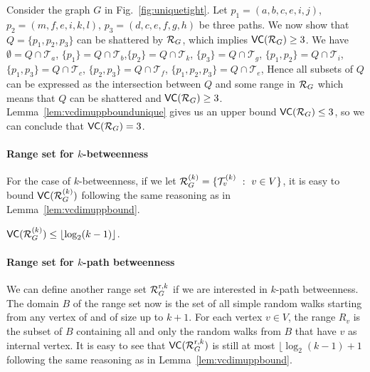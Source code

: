 \begin{IEEEproof}
  Consider the graph $G$ in Fig.~\ref{fig:uniquetight}.
  Let $p_1=(a,b,c,e,i,j)$, $p_2=(m,f,e,i,k,l)$, $p_3=(d,c,e,f,g,h)$ be three
  paths. We now show that $Q=\{p_1,p_2,p_3\}$ can be shattered by $\mathcal{R}_G$, which
  implies $\mathsf{VC}(\mathcal{R}_G)\ge 3$. We have $\emptyset=Q\cap\mathcal{T}_a$,
  $\{p_1\}=Q\cap\mathcal{T}_b$,$\{p_2\}=Q\cap\mathcal{T}_k$,
  $\{p_3\}=Q\cap\mathcal{T}_g$, $\{p_1,p_2\}=Q\cap\mathcal{T}_i$,
  $\{p_1,p_3\}=Q\cap\mathcal{T}_c$, $\{p_2,p_3\}=Q\cap\mathcal{T}_f$,
  $\{p_1,p_2,p_3\}=Q\cap\mathcal{T}_e$,  
  Hence all subsets of $Q$ can be expressed as the intersection between $Q$ and
  some range in $\mathcal{R}_G$ which means that $Q$ can be shattered and
  $\mathsf{VC}(\mathcal{R}_G)\ge 3$. Lemma~\ref{lem:vcdimuppboundunique} gives us an upper
  bound $\mathsf{VC}(\mathcal{R}_G)\le3$, so we can conclude that $\mathsf{VC}(\mathcal{R}_G)=3$.
\end{IEEEproof}

\paragraph{Range set for $k$-betweenness} For the case of $k$-betweenness, if we let
$\mathcal{R}_G^{(k)}=\{\mathcal{T}_v^{(k)}~:~ v\in V\}$, it is easy to bound
$\mathsf{VC}(\mathcal{R}_G^{(k)})$ following the same reasoning as in
Lemma~\ref{lem:vcdimuppbound}.
\begin{lemma}\label{lem:vcdimuppboundk}
$\mathsf{VC}(\mathcal{R}_G^{(k)})\le\lfloor\log_2(k-1)\rfloor$.
\end{lemma}

\paragraph{Range set for $k$-path betweenness}
We can define another range set $\mathcal{R}_G^{\mathrm{r},k}$ if we are interested
in $k$-path betweenness.  The domain $B$ of the range set now is the set of all
simple random walks starting from any vertex of and of size up to $k+1$. For
each vertex $v\in V$, the range $R_v$ is the subset of $B$ containing all and
only the random walks from $B$ that have $v$ as internal vertex. It is easy to
see that $\mathsf{VC}(\mathcal{R}_G^{\mathrm{r},k})$ is still at most $\lfloor\log_2(k-1)+1$
following the same reasoning as in Lemma~\ref{lem:vcdimuppbound}.

